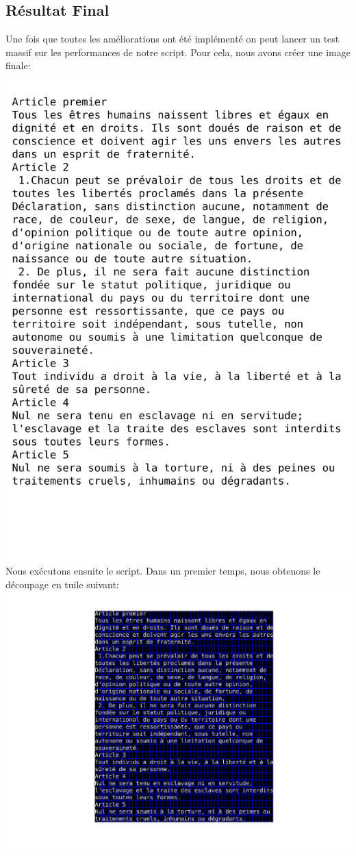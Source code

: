 \documentclass[a4paper,12pt,titlepage]{report}
\begin{document}
	\subsection{Résultat Final}
	Une fois que toutes les améliorations ont été implémenté on peut lancer un test massif sur les performances de notre script.
	Pour cela, nous avons créer une image finale:\\
	\includegraphics[scale=0.25]{../../Data/DUDH.png}
	Nous exécutons ensuite le script.
	Dans un premier temps, nous obtenons le découpage en tuile suivant:\\
	\includegraphics[scale=0.25]{../illus/tuilesDUDH.png}
\end{document}
